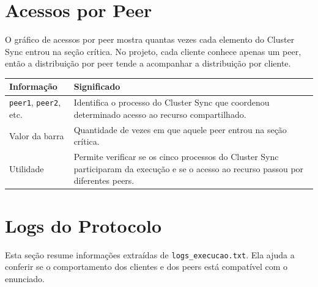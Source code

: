 \documentclass[12pt,a4paper]{article}
\begin{document}
\section{Acessos por Peer}

O gr\'afico de acessos por peer mostra quantas vezes cada elemento do Cluster Sync entrou na
se\c{c}\~ao cr\'itica. No projeto, cada cliente conhece apenas um peer, ent\~ao a distribui\c{c}\~ao
por peer tende a acompanhar a distribui\c{c}\~ao por cliente.

\begin{longtable}{>{\raggedright\arraybackslash}p{4cm} >{\raggedright\arraybackslash}p{10cm}}
\toprule
\textbf{Informa\c{c}\~ao} & \textbf{Significado} \\
\midrule
\texttt{peer1}, \texttt{peer2}, etc. &
Identifica o processo do Cluster Sync que coordenou determinado acesso ao recurso
compartilhado. \\
Valor da barra &
Quantidade de vezes em que aquele peer entrou na se\c{c}\~ao cr\'itica. \\
Utilidade &
Permite verificar se os cinco processos do Cluster Sync participaram da execu\c{c}\~ao e se
o acesso ao recurso passou por diferentes peers. \\
\bottomrule
\end{longtable}

\section{Logs do Protocolo}

Esta se\c{c}\~ao resume informa\c{c}\~oes extra\'idas de \texttt{logs\_execucao.txt}. Ela ajuda
a conferir se o comportamento dos clientes e dos peers est\'a compat\'ivel com o enunciado.
\end{document}
